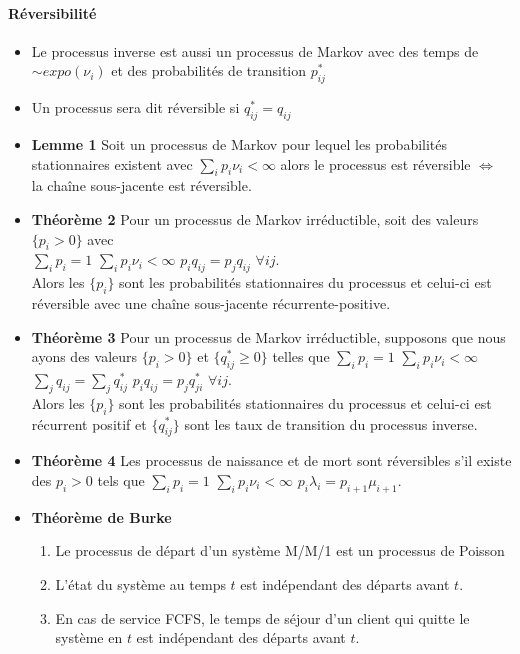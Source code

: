 \documentclass[paper=a4,fontsize=8pt,pagesize,DIV=calc]{scrartcl}
\newcounter{row}
\begin{document}
\begin{multicols}{3}
\paragraph{Réversibilité}
\begin{itemize}
\item Le processus inverse est aussi un processus de Markov avec des temps de $\sim expo(\nu_i)$ et des probabilités de transition $p_{ij}^*$
\item Un processus sera dit réversible si $q_{ij}^*= q_{ij}$
\item \textbf{Lemme 1} Soit un processus de Markov pour lequel les probabilités stationnaires existent avec $\sum_ip_i\nu_i<\infty $ alors le processus est réversible $\Leftrightarrow$ la chaîne sous-jacente est réversible.
\item \textbf{Théorème 2} Pour un processus de Markov irréductible, soit des valeurs $\{p_i > 0\}$ avec
\\$\sum_i p_i=1$ \quad $\sum_i p_i \nu_i<\infty$ \quad $p_i q_{ij}=p_jq_{ij}$ $\forall ij$.
\\Alors les $\{p_i\}$ sont les probabilités stationnaires du processus et celui-ci est réversible avec une chaîne sous-jacente récurrente-positive.
\item \textbf{Théorème 3} Pour un processus de Markov irréductible, supposons que nous ayons des valeurs $\{p_i > 0\}$ et $\{q_{ij}^*\geq 0\}$ telles que 
$\sum_i p_i=1$ \quad $\sum_i p_i \nu_i<\infty$ \quad $\sum_j q_{ij}=\sum_j q_{ij}^*$ \quad $p_iq_{ij}=p_jq_{ji}^*$ $\forall ij$.
\\Alors les $\{p_i \}$ sont les probabilités stationnaires du processus et celui-ci est récurrent positif et $\{q_{ij}^* \}$ sont les taux de transition du processus inverse.
\item \textbf{Théorème 4} Les processus de naissance et de mort sont réversibles s’il existe des $p_i > 0$ tels que
$\sum_i p_i=1$ \quad $\sum_i p_i \nu_i<\infty$ \quad $p_i \lambda_i=p_{i+1}\mu_{i+1}$.
\item \textbf{Théorème de Burke}
\begin{enumerate}
\item Le processus de départ d’un système M/M/1 est un processus de Poisson
\item L’état du système au temps $t$ est indépendant des départs avant $t$.
\item En cas de service FCFS, le temps de séjour d’un client qui quitte le système en $t$ est indépendant des départs avant $t$.
\end{enumerate}
\end{itemize}

\end{multicols}
\end{document}
